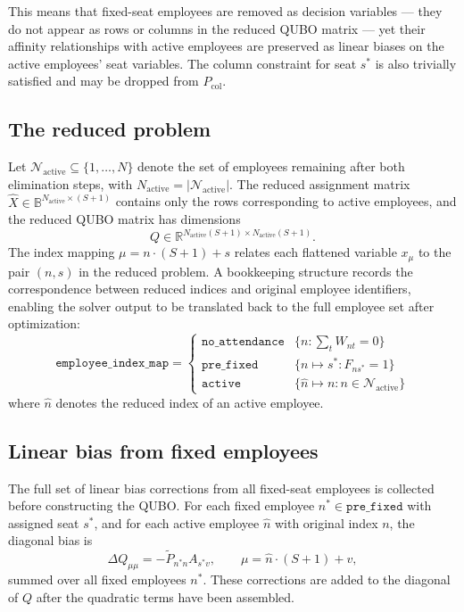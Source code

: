 \documentclass[10pt]{article}
\theoremstyle{definition}
\theoremstyle{plain}
\theoremstyle{remark}
\begin{document}
	This means that fixed-seat employees are removed as decision variables — they do 
	not appear as rows or columns in the reduced QUBO matrix — yet their affinity 
	relationships with active employees are preserved as linear biases on the active 
	employees' seat variables. The column constraint for seat $s^*$ is also trivially 
	satisfied and may be dropped from $P_\text{col}$.
	
	\subsection{The reduced problem}
	
	Let $\mathcal{N}_\text{active} \subseteq \{1, \dots, N\}$ denote the set of 
	employees remaining after both elimination steps, with $N_\text{active} = 
	|\mathcal{N}_\text{active}|$. The reduced assignment matrix $\hat{X} \in 
	\mathbb{B}^{N_\text{active} \times (S+1)}$ contains only the rows corresponding 
	to active employees, and the reduced QUBO matrix has dimensions
	\begin{equation}
	Q \in \mathbb{R}^{N_\text{active}(S+1) \times N_\text{active}(S+1)}.
	\end{equation}
	The index mapping $\mu = n \cdot (S+1) + s$ relates each flattened variable 
	$x_\mu$ to the pair $(n, s)$ in the reduced problem. A bookkeeping structure 
	records the correspondence between reduced indices and original employee 
	identifiers, enabling the solver output to be translated back to the full employee 
	set after optimization:
	\begin{equation}
	\texttt{employee\_index\_map} = \begin{cases}
		\texttt{no\_attendance} & \{n : \sum_t W_{nt} = 0\} \\
		\texttt{pre\_fixed} & \{n \mapsto s^* : F_{ns^*} = 1\} \\
		\texttt{active} & \{\hat{n} \mapsto n : n \in \mathcal{N}_\text{active}\}
	\end{cases}
	\end{equation}
	where $\hat{n}$ denotes the reduced index of an active employee.
	
	\subsection{Linear bias from fixed employees}
	
	The full set of linear bias corrections from all fixed-seat employees is collected 
	before constructing the QUBO. For each fixed employee $n^* \in \texttt{pre\_fixed}$ 
	with assigned seat $s^*$, and for each active employee $\hat{n}$ with original index 
	$n$, the diagonal bias is
	\begin{equation}
	\Delta Q_{\mu\mu} = -\tilde{P}_{n^* n} A_{s^* v}, 
	\qquad \mu = \hat{n} \cdot (S+1) + v,
	\end{equation}
	summed over all fixed employees $n^*$. These corrections are added to the diagonal 
	of $Q$ after the quadratic terms have been assembled.
	
\end{document}
